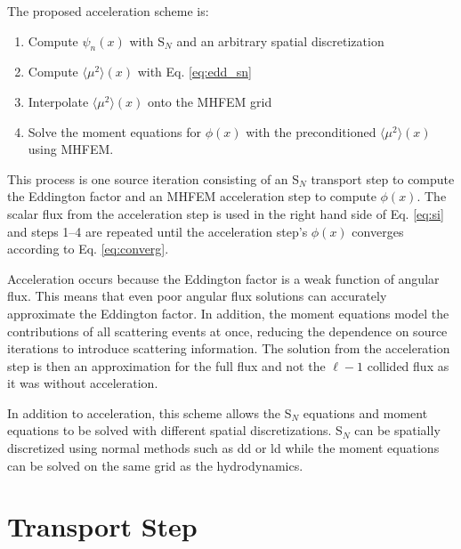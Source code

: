 \documentclass[11 pt]{article}
\newcommand{\SN}{S$_N$\xspace}
\newcommand{\edd}{\langle \mu^2 \rangle}
\begin{document}
	The proposed acceleration scheme is: 
		\begin{enumerate}[1)]
			\item Compute $\psi_n(x)$ with \SN and an arbitrary spatial discretization
			\item Compute $\edd(x)$ with Eq. \ref{eq:edd_sn}
			\item Interpolate $\edd(x)$ onto the MHFEM grid 
			\item Solve the moment equations for $\phi(x)$ with the preconditioned $\edd(x)$ using MHFEM. 
		\end{enumerate}
	This process is one source iteration consisting of an \SN transport step to compute the Eddington factor and an MHFEM acceleration step to compute $\phi(x)$. The scalar flux from the acceleration step is used in the right hand side of Eq. \ref{eq:si} and steps 1--4 are repeated until the acceleration step's $\phi(x)$ converges according to Eq. \ref{eq:converg}.  

	Acceleration occurs because the Eddington factor is a weak function of angular flux. This means that even poor angular flux solutions can accurately approximate the Eddington factor. In addition, the moment equations model the contributions of all scattering events at once, reducing the dependence on source iterations to introduce scattering information. The solution from the acceleration step is then an approximation for the full flux and not the $\ell - 1$ collided flux as it was without acceleration. 

	In addition to acceleration, this scheme allows the \SN equations and moment equations to be solved with different spatial discretizations. \SN can be spatially discretized using normal methods such as \gls{dd} or \gls{ld} while the moment equations can be solved on the same grid as the hydrodynamics. 


\section{Transport Step}


\end{document}
